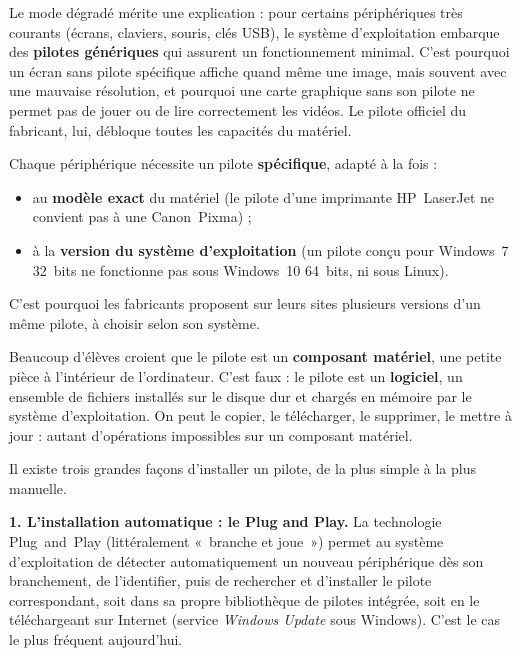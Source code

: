 \documentclass[11pt]{article}
\newcommand{\cle}[1]{{\popxbold\color{popdark}#1}}
\newcounter{popsec}
\newcounter{popsub}
\newcommand{\courssub}[1]{%
  \stepcounter{popsub}%
  \par\vspace{9pt}\noindent{\popxbold\fontsize{11.5}{13}\selectfont\color{popink}{\color{poporange}\thepopsec.\thepopsub}\hspace{6pt}#1}\par\nopagebreak\vspace{4pt}
}
\begin{document}
Le mode dégradé mérite une explication : pour certains périphériques très courants (écrans, claviers, souris, clés USB), le système d'exploitation embarque des \textbf{pilotes génériques} qui assurent un fonctionnement minimal. C'est pourquoi un écran sans pilote spécifique affiche quand même une image, mais souvent avec une mauvaise résolution, et pourquoi une carte graphique sans son pilote ne permet pas de jouer ou de lire correctement les vidéos. Le pilote officiel du fabricant, lui, débloque toutes les capacités du matériel.

\begin{propriete}
Chaque périphérique nécessite un pilote \textbf{spécifique}, adapté à la fois :
\begin{itemize}
  \item au \textbf{modèle exact} du matériel (le pilote d'une imprimante HP~LaserJet ne convient pas à une Canon~Pixma) ;
  \item à la \textbf{version du système d'exploitation} (un pilote conçu pour Windows~7 32~bits ne fonctionne pas sous Windows~10 64~bits, ni sous Linux).
\end{itemize}
C'est pourquoi les fabricants proposent sur leurs sites plusieurs versions d'un même pilote, à choisir selon son système.
\end{propriete}

\begin{attention}
Beaucoup d'élèves croient que le pilote est un \textbf{composant matériel}, une petite pièce à l'intérieur de l'ordinateur. C'est faux : le pilote est un \textbf{logiciel}, un ensemble de fichiers installés sur le disque dur et chargés en mémoire par le système d'exploitation. On peut le copier, le télécharger, le supprimer, le mettre à jour : autant d'opérations impossibles sur un composant matériel.
\end{attention}

\courssub{Les modes d'installation d'un pilote}

Il existe trois grandes façons d'installer un pilote, de la plus simple à la plus manuelle.

\textbf{1. L'installation automatique : le Plug and Play.} La technologie \cle{Plug~and~Play} (littéralement «~branche et joue~») permet au système d'exploitation de détecter automatiquement un nouveau périphérique dès son branchement, de l'identifier, puis de rechercher et d'installer le pilote correspondant, soit dans sa propre bibliothèque de pilotes intégrée, soit en le téléchargeant sur Internet (service \emph{Windows Update} sous Windows). C'est le cas le plus fréquent aujourd'hui.
\end{document}
